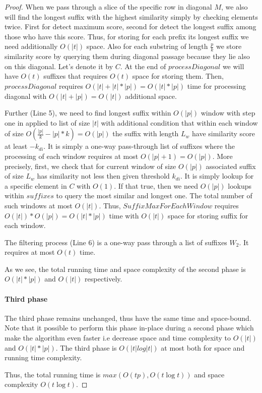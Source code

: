 \begin{proof}
When we pass through a slice of the specific row in diagonal $M$,  we also will find the longest suffix with the highest similarity simply by checking elements twice.
First for detect maximum score, second for detect the longest suffix among those who have this score.
Thus, for storing for each prefix its longest suffix we need additionally $O(|t|)$ space.
Also for each substring of length $\frac{p}{k}$ we store similarity score by querying them during diagonal passage because they lie also on this diagonal.
Let's denote it by $C$. 
At the end of  $processDiagonal$ we will have $O(t)$ suffixes that requires $O(t)$  space for storing them.
Then, $processDiagonal$ requires $O(|t|+|t|*|p|)=O(|t|*|p|)$ time for processing diagonal with $O(|t|+|p|)=O(|t|)$ additional space.
 
Further (Line 5), we need to find longest suffix within $O(|p|)$ window with step one in applied  to list of size $|t|$ with additional condition that within each window of size $O(\frac{|p|}{k}-|p|*k)=O(|p|)$ the suffix with length $L_{w}$ have similarity score at least $-k_{di}$.
It is simply a one-way pass-through list of suffixes where the processing of each window requires at most $O(|p|+1)=O(|p|)$.
More precisely, first, we check that for current window of size $O(|p|)$
associated suffix of size $L_{w}$ has similarity not less then given threshold $k_{di}$.
It is simply lookup for a specific element in $C$ with $O(1)$.
If that true, then we need $O(|p|)$ lookups within $suffixes$ to query the most similar and longest one.    
The total number of such windows at most $O(|t|)$.
Thus, $SuffixMaxForEachWindow$ requires $O(|t|)*O(|p|)=O(|t|*|p|)$ time with $O(|t|)$ space for storing suffix for each window. 

The filtering process (Line 6) is a one-way pass through a list of suffixes $W_2$.
It requires at most $O(t)$ time.

As we see, the total running time and space complexity of the second phase is $O(|t|*|p|)$ and $O(|t|)$ respectively.

\paragraph{Third phase}
The third phase remains unchanged, thus have the same time and space-bound.
Note that it possible to perform this phase in-place during a second phase which 
make the algorithm even faster i.e decrease space and time complexity to $O(|t|)$  and $O(|t|*|p|)$.
The third phase is $O(|t| log|t|)$  at most both for space and running time complexity.

Thus, the total running time is $max(O(tp),O(t \log t))$ and space complexity $O(t \log t)$. 
\end{proof}

